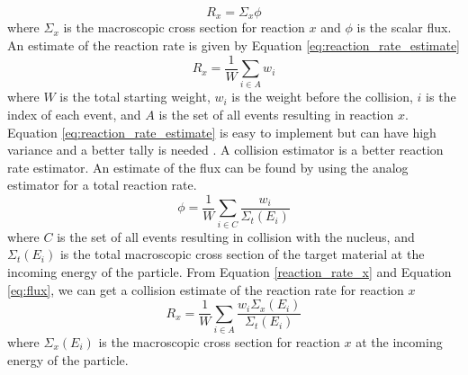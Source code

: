\begin{equation}\label{reaction_rate_x}
  R_{x} = \Sigma_{x} \phi
\end{equation}
where $\Sigma_{x}$ is the  macroscopic cross section for reaction $x$ and
$\phi$ is the scalar flux.
An estimate of the reaction rate is given by Equation \ref{eq:reaction_rate_estimate}
\begin{equation}\label{eq:reaction_rate_estimate}
  R_{x} = \frac{1}{W} \sum_{i \in A} w_{i}
\end{equation}
where $W$ is the total starting weight, $w_{i}$ is the weight before the
collision, $i$ is the index of each event, and $A$ is the set of all events
resulting in reaction $x$.
Equation \ref{eq:reaction_rate_estimate} is easy to implement but can have
high variance and a better tally is needed \cite{OpenMC}.
A collision estimator is a better reaction rate estimator.
An estimate of the flux can be found by using the analog estimator
for a total reaction rate.
\begin{equation}\label{eq:flux}
	\phi = \frac{1}{W} \sum_{i \in C} \frac{w_{i}}{\Sigma_{t}(E_{i})}
\end{equation}
where $C$ is the set of all events resulting in collision with the nucleus,
and  $\Sigma_{t}(E_{i})$ is the total macroscopic cross section of the
target material at the incoming energy of the particle.
From Equation \ref{reaction_rate_x} and Equation \ref{eq:flux}, we can get
a collision estimate of the reaction rate for reaction $x$
\begin{equation}\label{reaction_x_estimate}
  R_{x} = \frac{1}{W} \sum_{i \in A} \frac{w_{i} \Sigma_{x}(E_{i})}{\Sigma_{t}(E_{i})}
\end{equation}
where $\Sigma_{x}(E_{i})$ is the macroscopic cross section for reaction $x$
at the incoming energy of the particle.
\newpage
